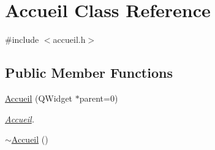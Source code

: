 \hypertarget{class_accueil}{\section{Accueil Class Reference}
\label{class_accueil}
}


{\ttfamily \#include $<$accueil.\-h$>$}

\subsection*{Public Member Functions}
\begin{DoxyCompactItemize}
\item 
\hyperlink{class_accueil_a581158b51548b6c3e60892035e9b656b}{Accueil} (Q\-Widget $\ast$parent=0)
\begin{DoxyCompactList}\small\item\em \hyperlink{class_accueil}{Accueil}. \end{DoxyCompactList}\item 
\hyperlink{class_accueil_a42a925af8942c76a73957ac9abcd45d7}{$\sim$\-Accueil} ()
\end{DoxyCompactItemize}
